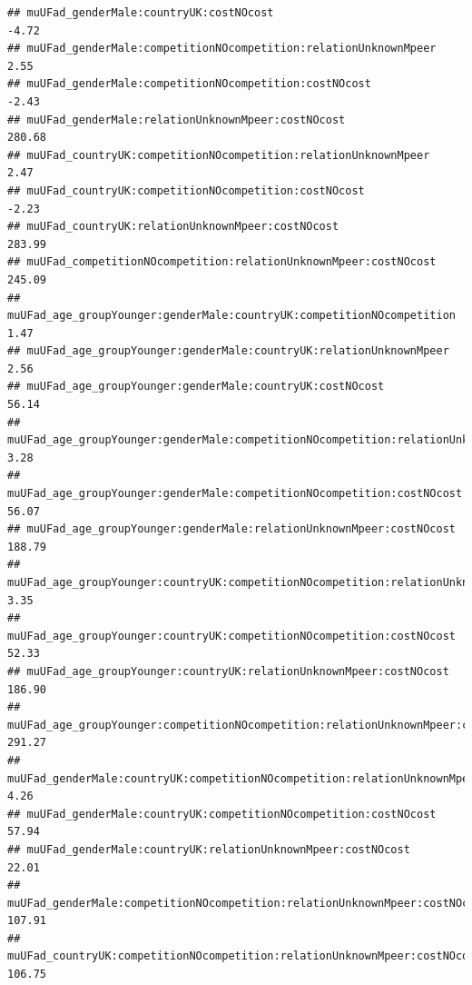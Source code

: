\documentclass[
]{article}
\begin{document}
\begin{verbatim}
## muUFad_genderMale:countryUK:costNOcost                                                                    -4.72
## muUFad_genderMale:competitionNOcompetition:relationUnknownMpeer                                            2.55
## muUFad_genderMale:competitionNOcompetition:costNOcost                                                     -2.43
## muUFad_genderMale:relationUnknownMpeer:costNOcost                                                        280.68
## muUFad_countryUK:competitionNOcompetition:relationUnknownMpeer                                             2.47
## muUFad_countryUK:competitionNOcompetition:costNOcost                                                      -2.23
## muUFad_countryUK:relationUnknownMpeer:costNOcost                                                         283.99
## muUFad_competitionNOcompetition:relationUnknownMpeer:costNOcost                                          245.09
## muUFad_age_groupYounger:genderMale:countryUK:competitionNOcompetition                                      1.47
## muUFad_age_groupYounger:genderMale:countryUK:relationUnknownMpeer                                          2.56
## muUFad_age_groupYounger:genderMale:countryUK:costNOcost                                                   56.14
## muUFad_age_groupYounger:genderMale:competitionNOcompetition:relationUnknownMpeer                           3.28
## muUFad_age_groupYounger:genderMale:competitionNOcompetition:costNOcost                                    56.07
## muUFad_age_groupYounger:genderMale:relationUnknownMpeer:costNOcost                                       188.79
## muUFad_age_groupYounger:countryUK:competitionNOcompetition:relationUnknownMpeer                            3.35
## muUFad_age_groupYounger:countryUK:competitionNOcompetition:costNOcost                                     52.33
## muUFad_age_groupYounger:countryUK:relationUnknownMpeer:costNOcost                                        186.90
## muUFad_age_groupYounger:competitionNOcompetition:relationUnknownMpeer:costNOcost                         291.27
## muUFad_genderMale:countryUK:competitionNOcompetition:relationUnknownMpeer                                  4.26
## muUFad_genderMale:countryUK:competitionNOcompetition:costNOcost                                           57.94
## muUFad_genderMale:countryUK:relationUnknownMpeer:costNOcost                                               22.01
## muUFad_genderMale:competitionNOcompetition:relationUnknownMpeer:costNOcost                               107.91
## muUFad_countryUK:competitionNOcompetition:relationUnknownMpeer:costNOcost                                106.75

\end{verbatim}
\end{document}
